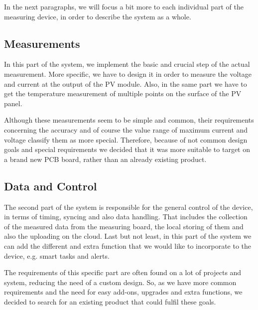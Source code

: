 In the next paragraphs, we will focus a bit more to each individual part of the measuring device, in order to describe the system as a whole.

\subsection{Measurements}
In this part of the system, we implement the basic and crucial step of the actual measurement. More specific, we have to design it in order to measure the voltage and current at the output of the PV module. Also, in the same part we have to get the temperature measurement of multiple points on the surface of the PV panel.

Although these measurements seem to be simple and common, their requirements concerning the accuracy and of course the value range of maximum current and voltage classify them as more special. Therefore, because of not common  design goals and special requirements we decided that it was more suitable to target on a brand new PCB board, rather than an already existing product.

\subsection{Data and Control}
The second part of the system is responsible for the general control of the device, in terms of timing, syncing and also data handling. That includes the collection of the measured data from the measuring board, the local storing of them and also the uploading on the cloud. Last but not least, in this part of the system we can add the different and extra function that we would like to incorporate to the device, e.g. smart tasks and alerts.

The requirements of this specific part are often found on a lot of projects and system, reducing the need of a custom design. So, as we have more common requirements and the need for easy add-ons, upgrades and extra functions, we decided to search for an existing product that could fulfil these goals.